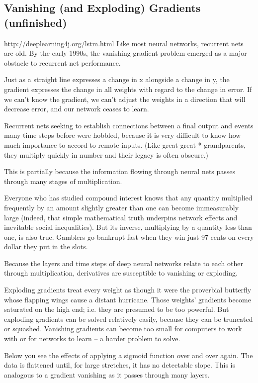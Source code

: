{\subsection{Vanishing (and Exploding) Gradients (unfinished)}
http://deeplearning4j.org/lstm.html
Like most neural networks, recurrent nets are old. By the early 1990s, the vanishing gradient problem emerged as a major obstacle to recurrent net performance.

Just as a straight line expresses a change in x alongside a change in y, the gradient expresses the change in all weights with regard to the change in error. If we can’t know the gradient, we can’t adjust the weights in a direction that will decrease error, and our network ceases to learn.

Recurrent nets seeking to establish connections between a final output and events many time steps before were hobbled, because it is very difficult to know how much importance to accord to remote inputs. (Like great-great-*-grandparents, they multiply quickly in number and their legacy is often obscure.)

This is partially because the information flowing through neural nets passes through many stages of multiplication.

Everyone who has studied compound interest knows that any quantity multiplied frequently by an amount slightly greater than one can become immeasurably large (indeed, that simple mathematical truth underpins network effects and inevitable social inequalities). But its inverse, multiplying by a quantity less than one, is also true. Gamblers go bankrupt fast when they win just 97 cents on every dollar they put in the slots.

Because the layers and time steps of deep neural networks relate to each other through multiplication, derivatives are susceptible to vanishing or exploding.

Exploding gradients treat every weight as though it were the proverbial butterfly whose flapping wings cause a distant hurricane. Those weights’ gradients become saturated on the high end; i.e. they are presumed to be too powerful. But exploding gradients can be solved relatively easily, because they can be truncated or squashed. Vanishing gradients can become too small for computers to work with or for networks to learn – a harder problem to solve.

Below you see the effects of applying a sigmoid function over and over again. The data is flattened until, for large stretches, it has no detectable slope. This is analogous to a gradient vanishing as it passes through many layers.

}
